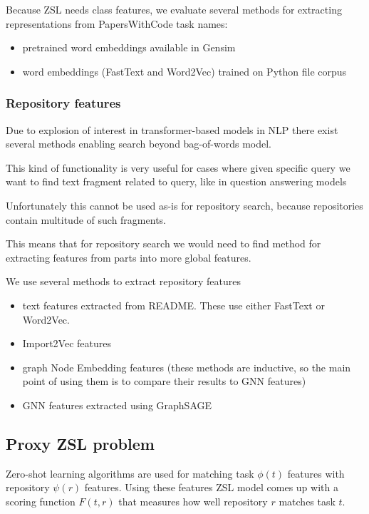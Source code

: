 \documentclass[11pt]{report}
\begin{document}
Because ZSL needs class features, we evaluate several methods for extracting representations from PapersWithCode task names:
\begin{itemize}
\item pretrained word embeddings available in Gensim \cite{rehurek2011gensim}
\item word embeddings (FastText and Word2Vec) trained on Python file corpus
\end{itemize}

\subsubsection{Repository features}

    Due to explosion of interest in transformer-based models in NLP there exist several methods enabling search beyond bag-of-words model.

    This kind of functionality is very useful for cases where given specific query we want to find text fragment related to query, like in question answering models

Unfortunately this cannot be used as-is for repository search, because repositories contain multitude of such fragments.

This means that for repository search we would need to find method  for extracting features from parts into more global features.

We use several methods to extract repository features
\begin{itemize}
    \item text features extracted from README. These use either FastText or Word2Vec.
    \item Import2Vec features
    \item graph Node Embedding features (these methods are inductive, so the main point of using them is to compare their results to GNN features)
    \item GNN features extracted using GraphSAGE
\end{itemize}


\subsection{Proxy ZSL problem}


Zero-shot learning algorithms are used for matching task \(\phi(t)\) features with repository \(\psi(r)\) features. Using these features ZSL model comes up with a scoring function $F(t, r)$ that measures how well repository $r$ matches task $t$.
\end{document}

